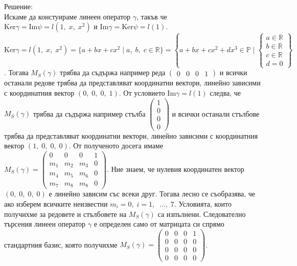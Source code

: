 \documentclass[12pt]{article}
\newcommand{\R}{\mathbb{R}}
\begin{document}
Решение: \\

Искаме да констуираме линеен оператор $\gamma$, такъв че \\

$\mathrm{Ker}\gamma = \mathrm{Im}\psi = l(1, \; x, \; x^2)$ и
$\mathrm{Im}\gamma = \mathrm{Ker}\psi = l(1)$.  \\

$\mathrm{Ker}\gamma = l(1, \; x, \; x^2) = \{a + bx + cx^2 \; | \; a, \; b, \; c \in \R \}
= \left\{a + bx + cx^2 + dx^3 \in \mathbb{P} \; \Bigg| \; \begin{cases}
    a \in \R \\
    b \in \R \\
    c \in \R \\
    d = 0
\end{cases}\right\}$. Тогава $M_S(\gamma)$ трябва да съдържа например реда $\begin{pmatrix} 0 & 0 & 0 & 1\end{pmatrix}$
и всички останали редове трябва да представляват координатни вектори, линейно зависими с координатния вектор $(0, \; 0, \; 0, \; 1)$.
От условието $\mathrm{Im}\gamma = l(1)$ следва, че $M_S(\gamma)$ трябва да съдържа например стълба $\begin{pmatrix}1 \\ 0 \\ 0 \\ 0 \end{pmatrix}$
и всички останали стълбове трябва да представляват координатни вектори, линейно зависими с координатния вектор $(1, \; 0, \; 0, \; 0)$.
От полученото досега имаме $M_S(\gamma) = \begin{pmatrix}
    0   & 0   & 0   & 1 \\
    m_1 & m_2 & m_3 & 0 \\
    m_4 & m_5 & m_6 & 0 \\
    m_7 & m_8 & m_8 & 0
\end{pmatrix}$. Ние знаем, че нулевия координатен вектор $(0, \; 0, \; 0, \; 0)$ е линейно зависим със всеки друг.
Тогава лесно се съобразява, че ако изберем всичките неизвестни $m_i = 0, \; i = 1, \; \; \dots, \; 7$.
Условията, които получихме за редовете и стълбовете на $M_S(\gamma)$ са изпълнени.
Следователно търсения линеен оператор $\gamma$ е определен само от матрицата си спрямо стандартния базис, която получихме $M_S(\gamma) = \begin{pmatrix}
    0 & 0 & 0 & 1 \\
    0 & 0 & 0 & 0 \\
    0 & 0 & 0 & 0 \\
    0 & 0 & 0 & 0
\end{pmatrix}$. \\\\
\end{document}
